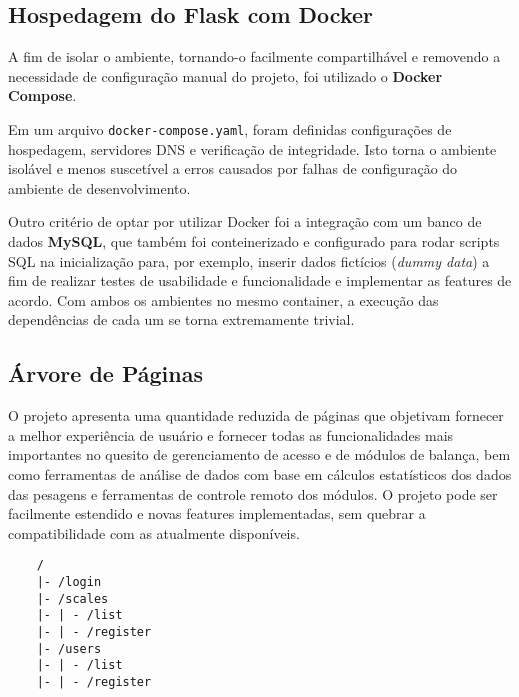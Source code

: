 \documentclass[11pt]{article}
\begin{document}
\subsection{Hospedagem do Flask com Docker}

A fim de isolar o ambiente, tornando-o facilmente compartilhável e removendo a necessidade de configuração manual do projeto, foi utilizado o \textbf{Docker Compose}.

Em um arquivo \texttt{docker-compose.yaml}, foram definidas configurações de hospedagem, servidores DNS e verificação de integridade. Isto torna o ambiente isolável e menos suscetível a erros causados por falhas de configuração do ambiente de desenvolvimento.

Outro critério de optar por utilizar Docker foi a integração com um banco de dados \textbf{MySQL}, que também foi conteinerizado e configurado para rodar scripts SQL na inicialização para, por exemplo, inserir dados fictícios (\textit{dummy data}) a fim de realizar testes de usabilidade e funcionalidade e implementar as features de acordo. Com ambos os ambientes no mesmo container, a execução das dependências de cada um se torna extremamente trivial.

\subsection{Árvore de Páginas}

O projeto apresenta uma quantidade reduzida de páginas que objetivam fornecer a melhor experiência de usuário e fornecer todas as funcionalidades mais importantes no quesito de gerenciamento de acesso e de módulos de balança, bem como ferramentas de análise de dados com base em cálculos estatísticos dos dados das pesagens e ferramentas de controle remoto dos módulos. O projeto pode ser facilmente estendido e novas features implementadas, sem quebrar a compatibilidade com as atualmente disponíveis.

\begin{verbatim}
    /
    |- /login
    |- /scales
    |- | - /list
    |- | - /register
    |- /users
    |- | - /list
    |- | - /register

\end{verbatim}
\end{document}
